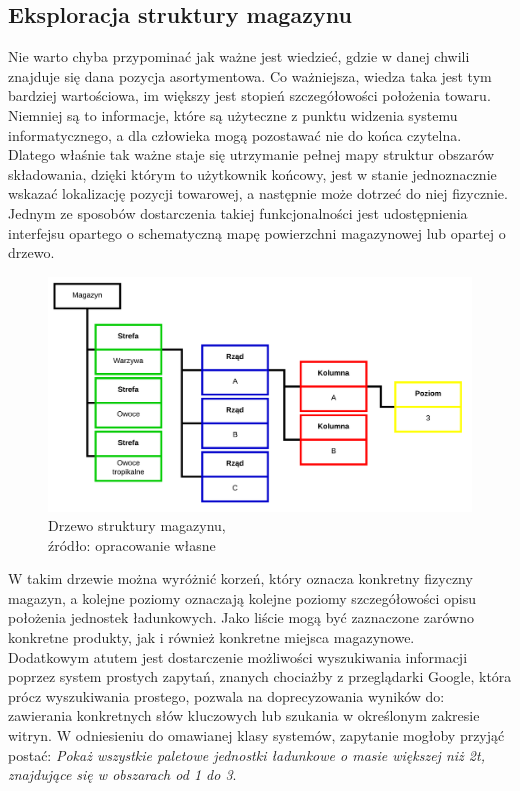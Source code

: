 	\subsection{Eksploracja struktury magazynu}
		Nie warto chyba przypominać jak ważne jest wiedzieć, gdzie w danej chwili znajduje się dana pozycja asortymentowa.
		Co ważniejsza, wiedza taka jest tym bardziej wartościowa, im większy jest stopień szczegółowości położenia towaru. 
		Niemniej są to informacje, które są użyteczne z punktu widzenia systemu informatycznego, a dla człowieka mogą
		pozostawać nie do końca czytelna. Dlatego właśnie tak ważne staje się utrzymanie pełnej mapy struktur obszarów
		składowania, dzięki którym to użytkownik końcowy, jest w stanie jednoznacznie wskazać lokalizację pozycji towarowej,
		a następnie może dotrzeć do niej fizycznie. Jednym ze sposobów dostarczenia takiej funkcjonalności jest 
		udostępnienia interfejsu opartego o schematyczną mapę powierzchni magazynowej lub opartej o drzewo. 
		\begin{figure}[h]
			\centering
			\includegraphics[width=1.1\textwidth]{images/warehouse_tree}
			\caption[Przykładowe drzewo eksploracji magazynu]{
				Drzewo struktury magazynu,\\
				źródło: opracowanie własne
			}
		\end{figure}
		W takim drzewie można wyróżnić korzeń, który oznacza konkretny fizyczny magazyn, a kolejne poziomy oznaczają 
		kolejne poziomy szczegółowości opisu położenia jednostek ładunkowych. Jako liście mogą być zaznaczone zarówno
		konkretne produkty, jak i również konkretne miejsca magazynowe. \\
		
		Dodatkowym atutem jest dostarczenie możliwości wyszukiwania informacji poprzez system prostych zapytań, 
		znanych chociażby z przeglądarki Google, która prócz wyszukiwania prostego, pozwala na doprecyzowania
		wyników do: zawierania konkretnych słów kluczowych lub szukania w określonym zakresie witryn. W odniesieniu
		do omawianej klasy systemów, zapytanie mogłoby przyjąć postać: \emph{Pokaż wszystkie paletowe jednostki
		ładunkowe o masie większej niż 2t, znajdujące się w obszarach od 1 do 3}. 
